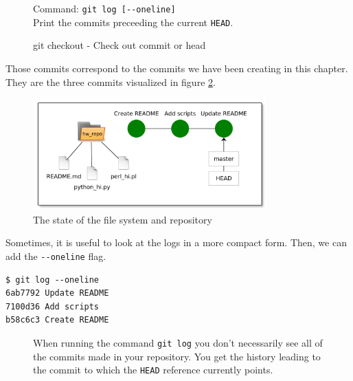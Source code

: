 \documentclass[../main/git_course_main.tex]{subfiles}
\begin{document}
\begin{figure}[h!]
\begin{bluebox}
Command: \verb$git log [--oneline]$ \\

Print the commits preceeding the current \verb$HEAD$.
\end{bluebox}
\label{command:diff}
\caption{git checkout - Check out commit or head}
\end{figure}

Those commits correspond to the commits we have been creating in this chapter.
They are the three commits visualized in figure \ref{fig:third_commit_chapter3}.

\begin{figure}[h!]
	\centering
	\includegraphics[width=0.8\textwidth]{../visualizations/chapter2/c26_repo_third_commit.pdf}
	\caption{The state of the file system and repository}
	\label{fig:third_commit_chapter3}
\end{figure}

Sometimes, it is useful to look at the logs in a more compact form. Then, we can add the \verb$--oneline$ flag.

\begin{codebox}
\begin{lstlisting}
$ git log --oneline
6ab7792 Update README
7100d36 Add scripts
b58c6c3 Create README
\end{lstlisting}
\end{codebox}

\begin{figure}[h!]
\begin{redbox}
When running the command \verb$git log$ you don't necessarily see all of the commits made in your repository. You get the history leading to the commit to which the \verb$HEAD$ reference currently points.
\end{redbox}
\end{figure}
\end{document}
